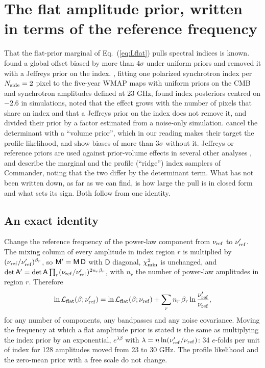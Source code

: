 \section{The flat amplitude prior, written in terms of the reference frequency}
\label{sec:flat}

That the flat-prior marginal of Eq.~(\ref{eq:Lflat}) pulls spectral indices is known.
\citet{eriksen2008} found a global offset biased by more than $4\sigma$ under uniform priors and
removed it with a Jeffreys prior on the index. \citet{dunkley2009}, fitting one polarized synchrotron
index per $N_{\rm side}=2$ pixel to the five-year WMAP maps with uniform priors on the CMB and
synchrotron amplitudes defined at 23 GHz, found index posteriors centred on $-2.6$ in simulations,
noted that the effect grows with the number of pixels that share an index and that a Jeffreys prior
on the index does not remove it, and divided their prior by a factor estimated from a noise-only
simulation. \citet{alonso2017} cancel the determinant with a ``volume prior'', which in our reading
makes their target the profile likelihood, and show biases of more than $3\sigma$ without it. Jeffreys
or reference priors are used against prior-volume effects in several other analyses
\citep{dickinson2009,planck2015x,jew2019}, and \citet{andersen2023} describe the marginal and the
profile (``ridge'') index samplers of Commander, noting that the two differ by the determinant term. What has not been
written down, as far as we can find, is how large the pull is in closed form and what sets its sign.
Both follow from one identity.

\subsection{An exact identity}

Change the reference frequency of the power-law component from $\nu_{\mathrm{ref}}$ to $\nu_{\mathrm{ref}}'$. The mixing
column of every amplitude in index region $r$ is multiplied by $(\nu_{\mathrm{ref}}/\nu_{\mathrm{ref}}')^{\beta_r}$, so
$\mathsf{M}' = \mathsf{M}\,\mathsf{D}$ with $\mathsf{D}$ diagonal, $\chi^2_{\min}$ is unchanged, and
$\det\mathsf{A}' = \det\mathsf{A} \prod_r (\nu_{\mathrm{ref}}/\nu_{\mathrm{ref}}')^{2 n_r \beta_r}$, with $n_r$ the number of power-law
amplitudes in region $r$. Therefore
\begin{equation}
  \ln \mathcal{L}_{\rm flat}(\beta;\nu_{\mathrm{ref}}') = \ln \mathcal{L}_{\rm flat}(\beta;\nu_{\mathrm{ref}})
  + \sum_r n_r\, \beta_r \ln\frac{\nu_{\mathrm{ref}}'}{\nu_{\mathrm{ref}}} ,
  \label{eq:tilt}
\end{equation}
for any number of components, any bandpasses and any noise covariance. Moving the frequency at which
a flat amplitude prior is stated is the same as multiplying the index prior by an exponential,
$e^{\lambda\beta}$ with $\lambda = n \ln(\nu_{\mathrm{ref}}'/\nu_{\mathrm{ref}})$: 34 $e$-folds per unit of index for 128
amplitudes moved from 23 to 30 GHz. The profile likelihood and the zero-mean prior with a free scale
do not change.

